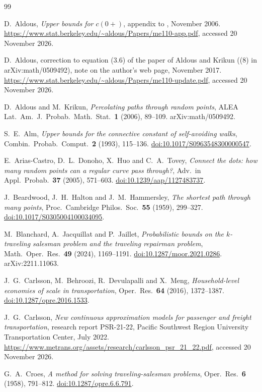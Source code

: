 \documentclass[11pt]{article}
\theoremstyle{remark}
\providecommand{\doi}[1]{\href{https://doi.org/#1}{doi:#1}}
\begin{document}
\begin{thebibliography}{99}

D.~Aldous, \emph{Upper bounds for $c(0+)$}, appendix to \cite{AK}, November 2006.
\url{https://www.stat.berkeley.edu/~aldous/Papers/me110-app.pdf}, accessed 20 November 2026.

D.~Aldous, correction to equation (3.6) of the paper of Aldous and Krikun ((8) in arXiv:math/0509492), note on the author's web page, November 2017.
\url{https://www.stat.berkeley.edu/~aldous/Papers/me110-update.pdf}, accessed 20 November 2026.

D.~Aldous and M.~Krikun, \emph{Percolating paths through random points}, ALEA Lat.\ Am.\ J.\ Probab.\ Math.\ Stat.\
\textbf{1} (2006), 89--109. arXiv:math/0509492.

S.~E.~Alm, \emph{Upper bounds for the connective constant of self-avoiding walks}, Combin.\ Probab.\ Comput.\
\textbf{2} (1993), 115--136. \doi{10.1017/S0963548300000547}.

E.~Arias-Castro, D.~L.~Donoho, X.~Huo and C.~A.~Tovey, \emph{Connect the dots: how many random points can a regular
curve pass through?}, Adv.\ in Appl.\ Probab.\ \textbf{37} (2005), 571--603. \doi{10.1239/aap/1127483737}.

\bibitem{BHH}
J.~Beardwood, J.~H.~Halton and J.~M.~Hammersley, \emph{The shortest path through many points}, Proc.\ Cambridge
Philos.\ Soc.\ \textbf{55} (1959), 299--327. \doi{10.1017/S0305004100034095}.

\bibitem{BJJ}
M.~Blanchard, A.~Jacquillat and P.~Jaillet, \emph{Probabilistic bounds on the $k$-traveling salesman problem and the
traveling repairman problem}, Math.\ Oper.\ Res.\ \textbf{49} (2024), 1169--1191. \doi{10.1287/moor.2021.0286}.
arXiv:2211.11063.

J.~G.~Carlsson, M.~Behroozi, R.~Devulapalli and X.~Meng, \emph{Household-level economies of scale in transportation},
Oper.\ Res.\ \textbf{64} (2016), 1372--1387. \doi{10.1287/opre.2016.1533}.

\bibitem{Carlsson}
J.~G.~Carlsson, \emph{New continuous approximation models for passenger and freight transportation}, research report
PSR-21-22, Pacific Southwest Region University Transportation Center, July 2022.
\url{https://www.metrans.org/assets/research/carlsson_psr_21_22.pdf}, accessed 20 November 2026.

\bibitem{Croes}
G.~A.~Croes, \emph{A method for solving traveling-salesman problems}, Oper.\ Res.\ \textbf{6} (1958), 791--812.
\doi{10.1287/opre.6.6.791}.


\end{thebibliography}
\end{document}

